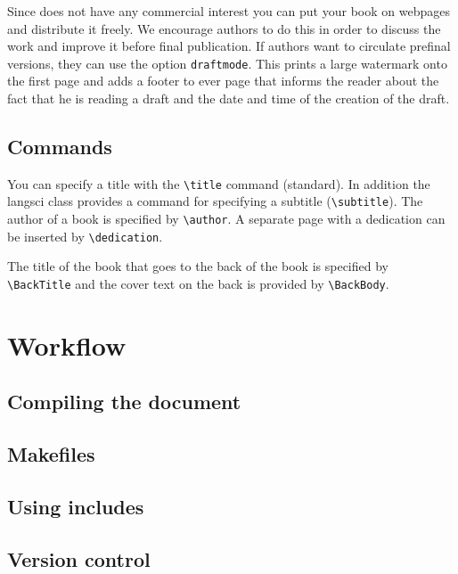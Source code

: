 Since \lsp does not have any commercial interest you can put your book on webpages and distribute it
freely. We encourage authors to do this in order to discuss the work and improve it before final
publication. If authors want to circulate prefinal versions, they can use the option
\texttt{draftmode}. This prints a large watermark onto the first page and adds a footer to ever page
that informs the reader about the fact that he is reading a draft and the date and time of the
creation of the draft.




\subsection{Commands}

You can specify a title with the \verb+\title+ command (\latex standard). In addition the langsci
class provides a command for specifying a subtitle (\verb+\subtitle+). The author of a book is
specified by \verb+\author+. A separate page with a dedication can be inserted by \verb+\dedication+.

The title of the book that goes to the back of the book is specified by \verb+\BackTitle+ and the
cover text on the back is provided by \verb+\BackBody+.


\section{Workflow}

\subsection{Compiling the document}

\subsection{Makefiles}

\subsection{Using includes}

\subsection{Version control}


